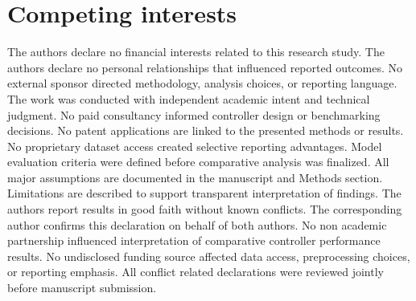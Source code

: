 \documentclass[twocolumn]{article}
\begin{document}
\section*{Competing interests}
The authors declare no financial interests related to this research study. The authors declare no personal relationships that influenced reported outcomes. No external sponsor directed methodology, analysis choices, or reporting language. The work was conducted with independent academic intent and technical judgment. No paid consultancy informed controller design or benchmarking decisions. No patent applications are linked to the presented methods or results. No proprietary dataset access created selective reporting advantages. Model evaluation criteria were defined before comparative analysis was finalized. All major assumptions are documented in the manuscript and Methods section. Limitations are described to support transparent interpretation of findings. The authors report results in good faith without known conflicts. The corresponding author confirms this declaration on behalf of both authors. No non academic partnership influenced interpretation of comparative controller performance results. No undisclosed funding source affected data access, preprocessing choices, or reporting emphasis. All conflict related declarations were reviewed jointly before manuscript submission.
\end{document}
